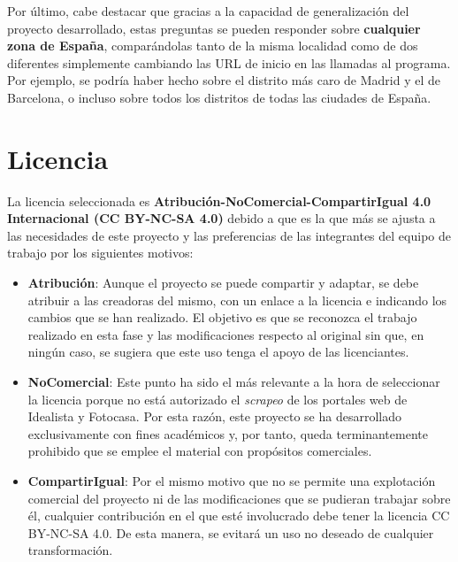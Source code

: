 \documentclass[12pt]{article}
\begin{document}
Por último, cabe destacar que gracias a la capacidad de generalización del proyecto desarrollado, estas preguntas se pueden responder sobre \textbf{cualquier zona de España}, comparándolas tanto de la misma localidad como de dos diferentes simplemente cambiando las URL de inicio en las llamadas al programa. Por ejemplo, se podría haber hecho sobre el distrito más caro de Madrid y el de Barcelona, o incluso sobre todos los distritos de todas las ciudades de España.

\newpage
\vspace{-1.5em}\section{Licencia }\vspace{-1em}

La licencia seleccionada es\textbf{ Atribución-NoComercial-CompartirIgual 4.0 Internacional (CC BY-NC-SA 4.0)} debido a que es la que más se ajusta a las necesidades de este proyecto y las preferencias de las integrantes del equipo de trabajo por los siguientes motivos:

\begin{itemize}[topsep=0cm,partopsep=0cm]
	\item \textbf{Atribución}: Aunque el proyecto se puede compartir y adaptar, se debe atribuir a las creadoras del mismo, con un enlace a la licencia e indicando los cambios que se han realizado. El objetivo es que se reconozca el trabajo realizado en esta fase y las modificaciones respecto al original sin que, en ningún caso, se sugiera que este uso tenga el apoyo de las licenciantes.  
	
	\item \textbf{NoComercial}: Este punto ha sido el más relevante a la hora de seleccionar la licencia porque no está autorizado el \textit{scrapeo} de los portales web de Idealista y Fotocasa. Por esta razón, este proyecto se ha desarrollado exclusivamente con fines académicos y, por tanto, queda terminantemente prohibido que se emplee el material con propósitos comerciales. 
	
	\item \textbf{CompartirIgual}: Por el mismo motivo que no se permite una explotación comercial del proyecto ni de las modificaciones que se pudieran trabajar sobre él, cualquier contribución en el que esté involucrado debe tener la licencia CC BY-NC-SA 4.0. De esta manera, se evitará un uso no deseado de cualquier transformación.
\end{itemize}
\end{document}
